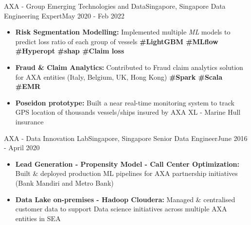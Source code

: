 \resumeSubheading
{AXA - Group Emerging Technologies and Data}{Singapore, Singapore}
{Data Engineering Expert}{May 2020 - Feb 2022}
\begin{itemize}
    \item \textbf{Risk Segmentation Modelling:} Implemented multiple \emph{ML} models to predict loss ratio of each group of vessels \textbf{\scriptsize{\#LightGBM \#MLflow \#Hyperopt \#shap \#Claim loss}}
    \item \textbf{Fraud \& Claim Analytics:} Contributed to Fraud claim analytics solution for AXA entities (Italy, Belgium, UK, Hong Kong) \textbf{\scriptsize{\#Spark \#Scala \#EMR}}
    \item \textbf{Poseidon prototype:} Built a near real-time monitoring system to track GPS location of thousands vessels/ships insured by AXA XL - Marine Hull insurance
\end{itemize}


\resumeSubheading
{AXA - Data Innovation Lab}{Singapore, Singapore}
{Senior Data Engineer}{June 2016 - April 2020}
\begin{itemize}
    \item \textbf{Lead Generation - Propensity Model - Call Center Optimization:} Built \& deployed production ML pipelines for AXA partnership initiatives (Bank Mandiri and Metro Bank)
    \item \textbf{Data Lake on-premises - Hadoop Cloudera:} Managed \& centralised customer data to support Data science initiatives across multiple AXA entities in SEA
\end{itemize}


